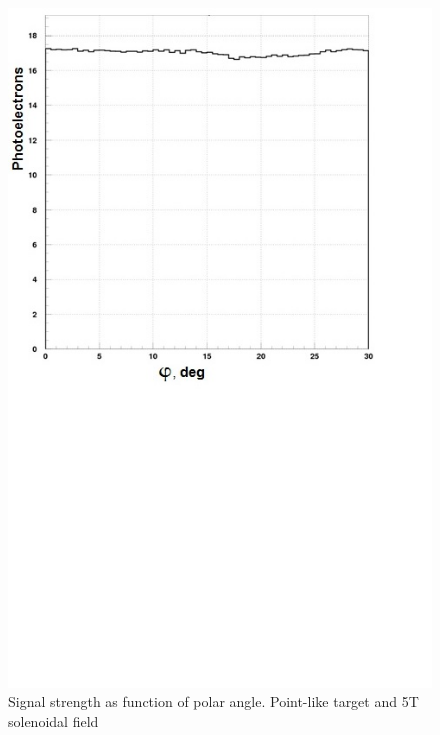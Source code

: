 \begin{figure}[!ht]
    \centering
    \includegraphics[width=1.0\linewidth,trim={0.0cm 9.4cm 0.0cm 0.0cm},clip]{images/Point_Targ_5T_Field_Phi.jpg}
    \caption{Signal strength as function of polar angle. Point-like target and 5T solenoidal field}
    \label{fig:Point_Targ_5T_Field_Phi}
\end{figure}

